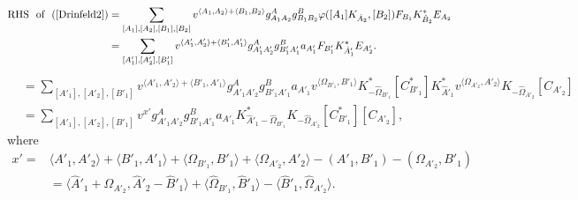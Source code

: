 \documentclass[reqno,12pt]{amsart}
\numberwithin{equation}{section}
\def\lr#1{\langle #1\rangle} \def\fin{\hfill$\square$}  \def\lra{\longrightarrow} \def\Tor{\mbox{\rm Tor}\,}
\theoremstyle{plain} %
\theoremstyle{definition} %
\begin{document}
\begin{equation*}\begin{split}
\mbox{RHS~~of}~~(\ref{Drinfeld2})&=\sum\limits_{[A_1],[A_2],[B_1],[B_2]}v^{\lr{A_1,A_2}+\lr{B_1,B_2}}g_{A_1A_2}^A
g_{B_1B_2}^B\varphi([A_1]K_{\hat{A}_2},[B_2])F_{B_1}K_{\hat{B}_2}^*E_{A_2}\\
&=\sum\limits_{[A'_1],[A'_2],[B'_1]}v^{\lr{A'_1,A'_2}+\lr{B'_1,A'_1}}g_{A'_1A'_2}^A
g_{B'_1A'_1}^Ba_{A'_1}F_{B'_1}K_{\hat{A}'_1}^*E_{A'_2}.
\end{split}\end{equation*}
\begin{equation*}\begin{split}
&=\sum\limits_{[A'_1],[A'_2],[B'_1]}v^{\lr{A'_1,A'_2}+\lr{B'_1,A'_1}}g_{A'_1A'_2}^A
g_{B'_1A'_1}^Ba_{A'_1}v^{\lr{\Omega_{B'_1},B'_1}}K_{-\hat{\Omega}_{B'_1}}^\ast[C_{B'_1}^\ast]K_{\hat{A}'_1}^*
v^{\lr{\Omega_{A'_2},A'_2}}K_{-\hat{\Omega}_{A'_2}}[C_{A'_2}]\\
&=\sum\limits_{[A'_1],[A'_2],[B'_1]}v^{x'}g_{A'_1A'_2}^A
g_{B'_1A'_1}^Ba_{A'_1}K_{\hat{A}'_1-\hat{\Omega}_{B'_1}}^\ast K_{-\hat{\Omega}_{A'_2}}[C_{B'_1}^\ast]
[C_{A'_2}],
\end{split}\end{equation*}
where \begin{equation*}\begin{split}
x'=&\lr{A'_1,A'_2}+\lr{B'_1,A'_1}+\lr{\Omega_{B'_1},B'_1}+\lr{\Omega_{A'_2},A'_2}-(A'_1,B'_1)-(\Omega_{A'_2},B'_1)\\
&=\lr{\hat{A}'_1+\hat{\Omega}_{A'_2},\hat{A}'_2-\hat{B}'_1}+\lr{\hat{\Omega}_{B'_1},\hat{B}'_1}-\lr{\hat{B}'_1,\hat{\Omega}_{A'_2}}.
\end{split}\end{equation*}
\end{document}
